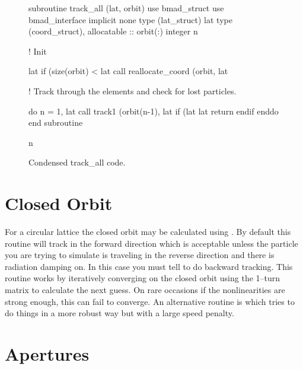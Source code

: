 {{{{{\begin{figure}[htb]
\begin{centering}
\small
\begin{listing}{1}
  subroutine track_all (lat, orbit)
    use bmad_struct
    use bmad_interface
    implicit none
    type (lat_struct)  lat
    type (coord_struct), allocatable :: orbit(:)
    integer n

  ! Init

    lat%
    if (size(orbit) < lat%
                    call reallocate_coord (orbit, lat%

  ! Track through the elements and check for lost particles.

    do n = 1, lat%
      call track1 (orbit(n-1), lat%
      if (lat%
        lat%
        return
      endif
    enddo
  end subroutine
\end{listing}
\label{f:track.all}
n\caption{Condensed track_all code.}
\end{centering}
\end{figure}

\section{Closed Orbit}

For a circular lattice the closed orbit may be calculated using
. By default this routine will track in the
forward direction which is acceptable unless the particle you are
trying to simulate is traveling in the reverse direction and there is
radiation damping on. In this case you must tell
 to do backward tracking. This routine works by
iteratively converging on the closed orbit using the 1--turn matrix to
calculate the next guess. On rare occasions if the nonlinearities are
strong enough, this can fail to converge. An alternative routine is
 which tries to do things in a more
robust way but with a large speed penalty.

\section{Apertures}
\label{s:tracking.apertures}


}}}}}
